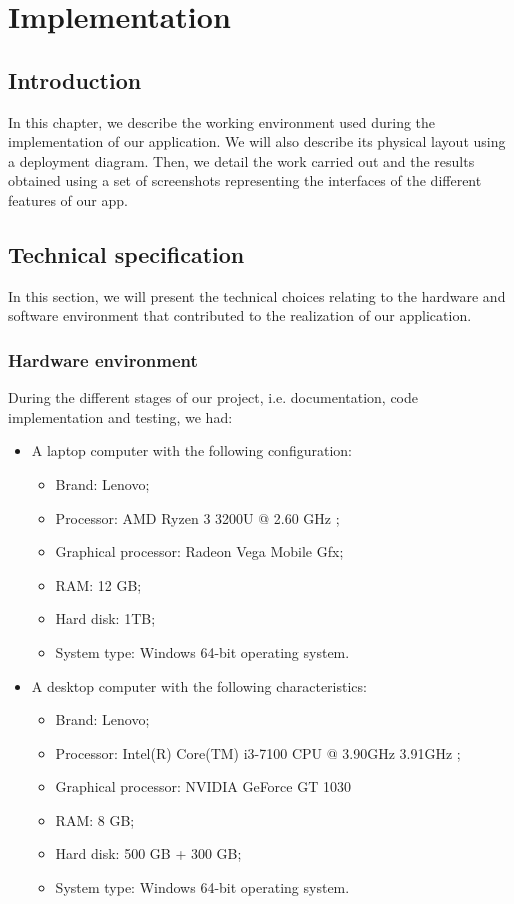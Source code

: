 \chapter{Implementation}
\section*{Introduction}
In this chapter, we describe the working environment used during
the implementation of our application. We will also describe its physical layout using a deployment diagram. Then, we
detail the work carried out and the results obtained using a set
of screenshots representing the interfaces of the different features of
our app.
\section{Technical specification}
In this section, we will present the technical choices relating to
the hardware and software environment that contributed to the realization of our
application.
\subsection{Hardware environment}
During the different stages of our project, i.e. documentation,
code implementation and testing, we had:
\begin{itemize}
\item A laptop computer with the following configuration:
\begin{itemize}
\item Brand: Lenovo;
\item Processor: AMD Ryzen 3 3200U @ 2.60 GHz ;
\item Graphical processor:  Radeon Vega Mobile Gfx;
\item RAM: 12 GB;
\item Hard disk: 1TB;
\item System type: Windows 64-bit operating system.
\end{itemize} 
\item A desktop computer with the following characteristics:
\begin{itemize}
\item Brand: Lenovo;
\item Processor: Intel(R) Core(TM) i3-7100 CPU @ 3.90GHz 3.91GHz ;
\item Graphical processor: NVIDIA GeForce GT 1030
\item RAM: 8 GB;
\item Hard disk: 500 GB + 300 GB;
\item System type: Windows 64-bit operating system.
\end{itemize}
\end{itemize}
